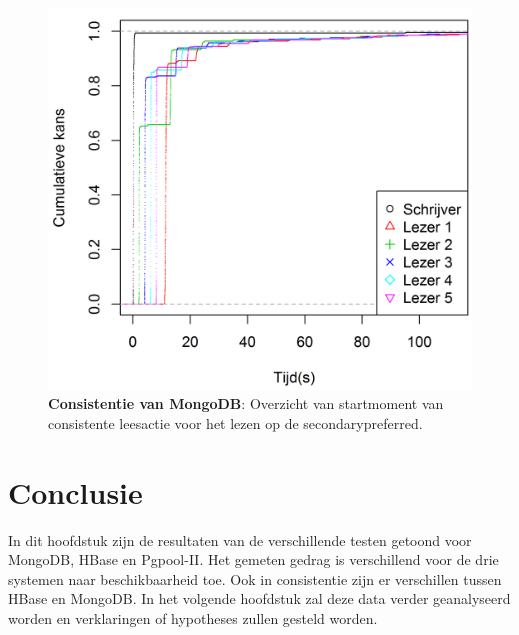 \begin{figure}[htb!] 
	\centering
	\includegraphics[width=.70\textwidth]{img/Observaties/MongoDB/ECDF-plot-Start-updateRawData-majority-secondarypreferred-1}
	\caption{\textbf{Consistentie van MongoDB}: Overzicht van startmoment van consistente leesactie voor het lezen op de secondarypreferred.  }
	\label{fig:consistentie-mongodb-secondarypreferred}
\end{figure}

\FloatBarrier
\section{Conclusie}
In dit hoofdstuk zijn de resultaten van de verschillende testen getoond voor MongoDB, HBase en Pgpool-II. Het gemeten gedrag is verschillend voor de drie systemen naar beschikbaarheid toe. Ook in consistentie zijn er verschillen tussen HBase en MongoDB. 
In het volgende hoofdstuk zal deze data verder geanalyseerd worden en verklaringen of hypotheses zullen gesteld worden. 